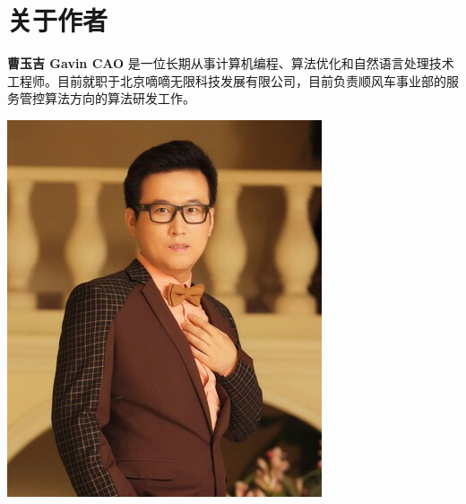 \documentclass[twoside,a4paper,12pt]{book}%
\begin{document}
\chapter{关于作者}
\label{ch:Author}

\begin{minipage}{0.7\linewidth}
	\textbf{曹玉吉 Gavin CAO} 是一位长期从事计算机编程、算法优化和自然语言处理技术工程师。目前就职于北京嘀嘀无限科技发展有限公司，目前负责顺风车事业部的服务管控算法方向的算法研发工作。
\end{minipage}
\hfill
\begin{minipage}{0.25\linewidth}
	\includegraphics[width=0.99\linewidth]{author}  
\end{minipage}



\tableofcontents
\end{document}
